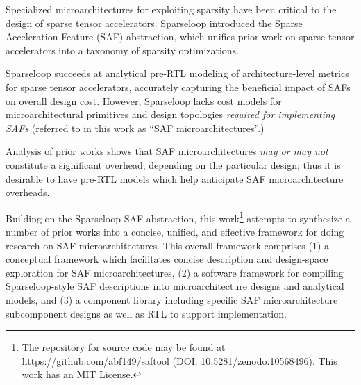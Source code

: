% 
% 
%



Specialized microarchitectures for exploiting sparsity have been critical to the design of sparse tensor accelerators. Sparseloop introduced the Sparse Acceleration Feature (SAF) abstraction, which unifies prior work on sparse tensor accelerators into a taxonomy of sparsity optimizations.

Sparseloop succeeds at analytical pre-RTL modeling of architecture-level metrics for sparse tensor accelerators, accurately capturing the beneficial impact of SAFs on overall design cost. However, Sparseloop lacks cost models for microarchitectural primitives and design topologies \textit{required for implementing SAFs} (referred to in this work as ``SAF microarchitectures''.) 

Analysis of prior works shows that SAF microarchitectures \textit{may or may not} constitute a significant overhead, depending on the particular design; thus it is desirable to have pre-RTL models which help anticipate SAF microarchitecture overheads.

Building on the Sparseloop SAF abstraction, this work\footnote{The repository for source code may be found at \url{https://github.com/abf149/saftool} (DOI: 10.5281/zenodo.10568496). This work has an MIT License.}
 attempts to synthesize a number of prior works into a concise, unified, and effective framework for doing research on SAF microarchitectures. This overall framework comprises (1) a conceptual framework which facilitates concise description and design-space exploration for SAF microarchitectures, (2) a software framework for compiling Sparseloop-style SAF descriptions into microarchitecture designs and analytical models, and (3) a component library including specific SAF microarchitecture subcomponent designs as well as RTL to support implementation.